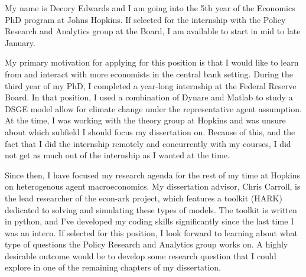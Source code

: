 \documentclass{scrartcl}
\begin{document}
\par My name is Decory Edwards and I am going into the 5th year of the Economics PhD program at Johns Hopkins. 
If selected for the internship with the Policy Research and Analytics group at the Board, I am available to start in mid to late January. 

\par My primary motivation for applying for this position is that I would like to learn from and interact with
more economists in the central bank setting. During the third year of my PhD, I completed a year-long internship at the Federal Reserve Board.
In that position, I used a combination of Dynare and Matlab to study a DSGE model allow for climate change under the representative agent assumption.
At the time, I was working with the theory group at Hopkins and was unsure about which subfield I should focus my dissertation on.
Because of this, and the fact that I did the internship remotely and concurrently with my courses, I did not get as much out of the internship as I wanted at the time.

\par Since then, I have focused my research agenda for the rest of my time at Hopkins on heterogenous agent macroeconomics. 
My dissertation advisor, Chris Carroll, is the lead researcher of the econ-ark project, which features a toolkit (HARK) dedicated to solving and simulating these types of models. 
The toolkit is written in python, and I’ve developed my coding skills significantly since the last time I was an intern. 
If selected for this position, I look forward to learning about what type of questions the Policy Research and Analytics group works on.
A highly desirable outcome would be to develop some research question that I could explore in one of the remaining chapters of my dissertation.
\end{document}
